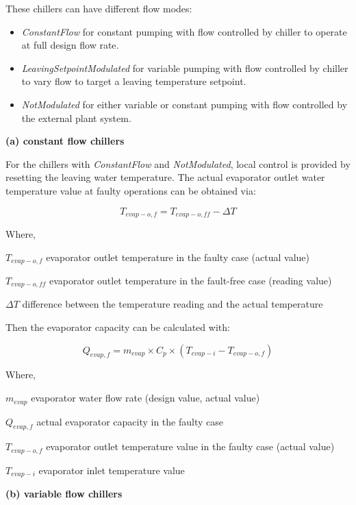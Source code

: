 These chillers can have different flow modes:

\begin{itemize}
\tightlist
\item
  \emph{ConstantFlow} for constant pumping with flow controlled by chiller to operate at full design flow rate.
\item
  \emph{LeavingSetpointModulated} for variable pumping with flow controlled by chiller to vary flow to target a leaving temperature setpoint.
\item
  \emph{NotModulated} for either variable or constant pumping with flow controlled by the external plant system.
\end{itemize}

\textbf{(a) constant flow chillers}

For the chillers with \emph{ConstantFlow} and \emph{NotModulated}, local control is provided by resetting the leaving water temperature. The actual evaporator outlet water temperature value at faulty operations can be obtained via:

\begin{equation}
T_{evap-o,f} = T_{evap-o,ff} - \Delta T
\end{equation}

Where, 

\(T_{evap-o,f}\) evaporator outlet temperature in the faulty case (actual value)

\(T_{evap-o,ff}\) evaporator outlet temperature in the fault-free case (reading value)

\(\Delta T\) difference between the temperature reading and the actual temperature

Then the evaporator capacity can be calculated with:

\begin{equation}
Q_{evap,f} = m_{evap} \times C_p \times (T_{evap-i} - T_{evap-o,f} )
\end{equation}

Where, 

\(m_{evap}\) evaporator water flow rate (design value, actual value)

\(Q_{evap,f}\) actual evaporator capacity in the faulty case

\(T_{evap-o,f}\) evaporator outlet temperature value in the faulty case (actual value)

\(T_{evap-i}\) evaporator inlet temperature value \newline

\textbf{(b) variable flow chillers}

